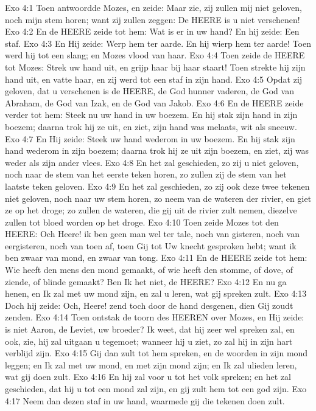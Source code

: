 Exo 4:1  Toen antwoordde Mozes, en zeide: Maar zie, zij zullen mij niet geloven, noch mijn stem horen; want zij zullen zeggen: De HEERE is u niet verschenen!
Exo 4:2  En de HEERE zeide tot hem: Wat is er in uw hand? En hij zeide: Een staf.
Exo 4:3  En Hij zeide: Werp hem ter aarde. En hij wierp hem ter aarde! Toen werd hij tot een slang; en Mozes vlood van haar.
Exo 4:4  Toen zeide de HEERE tot Mozes: Strek uw hand uit, en grijp haar bij haar staart! Toen strekte hij zijn hand uit, en vatte haar, en zij werd tot een staf in zijn hand.
Exo 4:5  Opdat zij geloven, dat u verschenen is de HEERE, de God hunner vaderen, de God van Abraham, de God van Izak, en de God van Jakob.
Exo 4:6  En de HEERE zeide verder tot hem: Steek nu uw hand in uw boezem. En hij stak zijn hand in zijn boezem; daarna trok hij ze uit, en ziet, zijn hand was melaats, wit als sneeuw.
Exo 4:7  En Hij zeide: Steek uw hand wederom in uw boezem. En hij stak zijn hand wederom in zijn boezem; daarna trok hij ze uit zijn boezem, en ziet, zij was weder als zijn ander vlees.
Exo 4:8  En het zal geschieden, zo zij u niet geloven, noch naar de stem van het eerste teken horen, zo zullen zij de stem van het laatste teken geloven.
Exo 4:9  En het zal geschieden, zo zij ook deze twee tekenen niet geloven, noch naar uw stem horen, zo neem van de wateren der rivier, en giet ze op het droge; zo zullen de wateren, die gij uit de rivier zult nemen, diezelve zullen tot bloed worden op het droge.
Exo 4:10  Toen zeide Mozes tot den HEERE: Och Heere! ik ben geen man wel ter tale, noch van gisteren, noch van eergisteren, noch van toen af, toen Gij tot Uw knecht gesproken hebt; want ik ben zwaar van mond, en zwaar van tong.
Exo 4:11  En de HEERE zeide tot hem: Wie heeft den mens den mond gemaakt, of wie heeft den stomme, of dove, of ziende, of blinde gemaakt? Ben Ik het niet, de HEERE?
Exo 4:12  En nu ga henen, en Ik zal met uw mond zijn, en zal u leren, wat gij spreken zult.
Exo 4:13  Doch hij zeide: Och, Heere! zend toch door de hand desgenen, dien Gij zoudt zenden.
Exo 4:14  Toen ontstak de toorn des HEEREN over Mozes, en Hij zeide: is niet Aaron, de Leviet, uw broeder? Ik weet, dat hij zeer wel spreken zal, en ook, zie, hij zal uitgaan u tegemoet; wanneer hij u ziet, zo zal hij in zijn hart verblijd zijn.
Exo 4:15  Gij dan zult tot hem spreken, en de woorden in zijn mond leggen; en Ik zal met uw mond, en met zijn mond zijn; en Ik zal ulieden leren, wat gij doen zult.
Exo 4:16  En hij zal voor u tot het volk spreken; en het zal geschieden, dat hij u tot een mond zal zijn, en gij zult hem tot een god zijn.
Exo 4:17  Neem dan dezen staf in uw hand, waarmede gij die tekenen doen zult.
